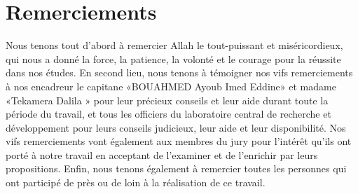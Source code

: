 \chapter*{Remerciements}

Nous tenons tout d’abord à remercier Allah le tout-puissant et miséricordieux, qui nous a donné la force, la patience, la volonté et le courage pour la réussite dans nos études. En second lieu, nous tenons à témoigner nos vifs remerciements à nos encadreur le capitane «BOUAHMED Ayoub Imed Eddine» et madame «Tekamera Dalila » pour leur précieux conseils et leur aide durant toute la période du travail, et tous les officiers du laboratoire central de recherche et développement
pour leurs conseils judicieux, leur aide et leur disponibilité. Nos vifs remerciements vont également aux membres du jury pour l’intérêt qu’ils ont porté à notre travail en acceptant de l’examiner et de l’enrichir par leurs propositions. Enfin, nous tenons également à remercier toutes les personnes qui ont participé de près ou de loin à la réalisation de ce travail.





